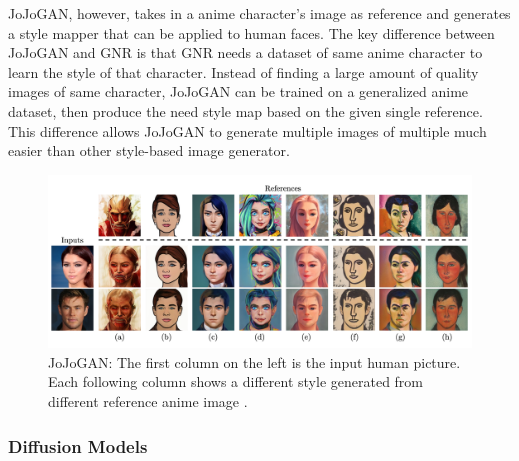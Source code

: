 JoJoGAN, however, takes in a anime character's image as reference and generates
a style mapper that can be applied to human faces.
The key difference between JoJoGAN and GNR is that GNR needs a dataset of same anime character to learn the style of that character.
Instead of finding a large amount of quality images of same character,
JoJoGAN can be trained on a generalized anime dataset,
then produce the need style map based on the given single reference.
This difference allows JoJoGAN to generate multiple images of multiple much easier than other style-based image generator.
\begin{figure}[h]
    \includegraphics[width=\textwidth]{img/JoJo-1.png}
    \caption{
        JoJoGAN: The first column on the left is the input human picture.
        Each following column shows a different style generated from different reference anime image \cite{chong2021jojogan}.
    }
\end{figure}

\subsubsection*{Diffusion Models}